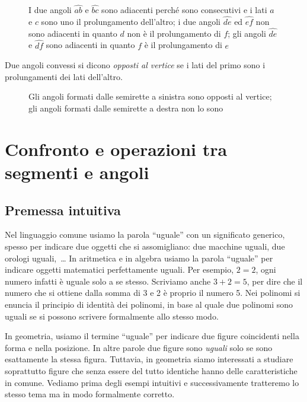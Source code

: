 \begin{figure}[htb]
 \centering 
\caption{I due angoli $\widehat{ab}$ e $\widehat{bc}$ sono adiacenti perché sono consecutivi e i lati $a$ e $c$ sono uno il prolungamento dell'altro; i due angoli $\widehat{de}$ ed $\widehat{ef}$ non sono adiacenti in quanto $d$ non è il prolungamento di $f$; gli angoli $\widehat{de}$ e $\widehat{df}$ sono adiacenti in quanto $f$ è il prolungamento di $e$}\label{fig:1.23}
\end{figure}

\begin{definizione}
Due angoli convessi si dicono \emph{opposti al vertice} se i lati del primo sono i prolungamenti dei lati dell'altro.
\end{definizione}

\begin{figure}[htb]
 \centering 
\caption{Gli angoli formati dalle semirette a sinistra sono opposti al vertice; gli angoli formati dalle semirette a destra non lo sono}\label{fig:1.24}
\end{figure}


\section{Confronto e operazioni tra segmenti e angoli}

\subsection{Premessa intuitiva}

Nel linguaggio comune usiamo la parola ``uguale'' con un significato generico, spesso per indicare due oggetti che si assomigliano: due macchine uguali, due orologi uguali,~\ldots{} In aritmetica e in algebra usiamo la parola ``uguale'' per indicare oggetti matematici perfettamente uguali. Per esempio, $2=2$, ogni numero infatti è uguale solo a se stesso. Scriviamo anche $3+2=5$, per dire che il numero che si ottiene dalla somma di 3 e 2 è proprio il numero 5. Nei polinomi si enuncia il principio di identità dei polinomi, in base al quale due polinomi sono uguali se si possono scrivere formalmente allo stesso modo.

In geometria, usiamo il termine ``uguale'' per indicare due figure coincidenti nella forma e nella posizione. In altre parole due figure sono \emph{uguali} solo se sono esattamente la stessa figura. Tuttavia, in geometria siamo interessati a studiare soprattutto figure che senza essere del tutto identiche hanno delle caratteristiche in comune. Vediamo prima degli esempi intuitivi e successivamente tratteremo lo stesso tema ma in modo formalmente corretto.

